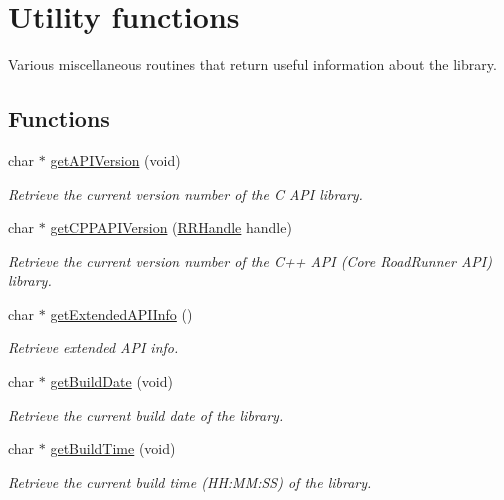 \hypertarget{group__utility}{\section{Utility functions}
\label{group__utility}
}


Various miscellaneous routines that return useful information about the library.  


\subsection*{Functions}
\begin{DoxyCompactItemize}
\item 
char $\ast$ \hyperlink{group__utility_ga15926a2382e69eb842d4f74e76fe6572}{get\+A\+P\+I\+Version} (void)
\begin{DoxyCompactList}\small\item\em Retrieve the current version number of the C A\+P\+I library. \end{DoxyCompactList}\item 
char $\ast$ \hyperlink{group__utility_ga54b7e9e1d61787294e15b00ad485ec01}{get\+C\+P\+P\+A\+P\+I\+Version} (\hyperlink{rrc__types_8h_a1d68f0592372208fa5a5f2799ea4b3ae}{R\+R\+Handle} handle)
\begin{DoxyCompactList}\small\item\em Retrieve the current version number of the C++ A\+P\+I (Core Road\+Runner A\+P\+I) library. \end{DoxyCompactList}\item 
char $\ast$ \hyperlink{group__utility_ga4aa3b25a273d9d7c4c1750e51818bd56}{get\+Extended\+A\+P\+I\+Info} ()
\begin{DoxyCompactList}\small\item\em Retrieve extended A\+P\+I info. \end{DoxyCompactList}\item 
char $\ast$ \hyperlink{group__utility_ga3997a57475e6d266df999b8e94f000b1}{get\+Build\+Date} (void)
\begin{DoxyCompactList}\small\item\em Retrieve the current build date of the library. \end{DoxyCompactList}\item 
char $\ast$ \hyperlink{group__utility_ga4e9d3eb8e6659d8c2696a3a81d64d6d8}{get\+Build\+Time} (void)
\begin{DoxyCompactList}\small\item\em Retrieve the current build time (H\+H\+:\+M\+M\+:S\+S) of the library. \end{DoxyCompactList}\item 

\end{DoxyCompactItemize}
